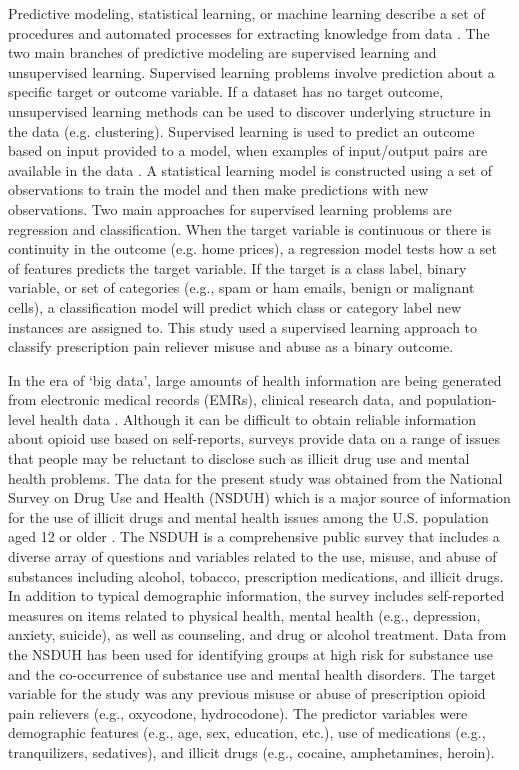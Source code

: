 \documentclass[sigconf]{acmart}
\begin{document}
Predictive modeling, statistical learning, or machine learning describe a 
set of procedures and automated processes for extracting knowledge from 
data \cite{james13, kuhn13, muller17, raschka17}. The two main branches 
of predictive modeling are supervised learning and unsupervised learning. 
Supervised learning problems involve prediction about a specific target 
or outcome variable. If a dataset has no target outcome, unsupervised 
learning methods can be used to discover underlying structure in the data 
(e.g. clustering). Supervised learning is used to predict an outcome based 
on input provided to a model, when examples of input/output pairs are 
available in the data \cite{muller17}. A statistical learning model is 
constructed using a set of observations to train the model and then make
predictions with new observations. Two main approaches for supervised learning 
problems are regression and classification. When the target variable
is continuous or there is continuity in the outcome (e.g. home prices), a 
regression model tests how a set of features predicts the target variable. 
If the target is a class label, binary variable, or set of categories 
(e.g., spam or ham emails, benign or malignant cells), a classification model 
will predict which class or category label new instances are assigned to. 
This study used a supervised learning approach to classify prescription pain
reliever misuse and abuse as a binary outcome. 


In the era of `big data', large amounts of health information are being 
generated from electronic medical records (EMRs), clinical research data, and 
population-level health data \cite{herland14}. Although it can be difficult 
to obtain reliable information about opioid use based on self-reports, surveys 
provide data on a range of issues that people may be reluctant to disclose 
such as illicit drug use and mental health problems. The data for the present 
study was obtained from the National Survey on Drug Use and Health (NSDUH) 
which is a major source of information for the use of illicit drugs and mental 
health issues among the U.S. population aged 12 or older \cite{samhsa18}. 
The NSDUH is a comprehensive public survey that includes a diverse array 
of questions and variables related to the use, misuse, and abuse of substances 
including alcohol, tobacco, prescription medications, and illicit drugs. In 
addition to typical demographic information, the survey includes self-reported
measures on items related to physical health, mental health (e.g., depression, 
anxiety, suicide), as well as counseling, and drug or alcohol treatment. Data 
from the NSDUH has been used for identifying groups at high risk for substance 
use and the co-occurrence of substance use and mental health disorders. The 
target variable for the study was any previous misuse or abuse of prescription 
opioid pain relievers (e.g., oxycodone, hydrocodone). The predictor variables 
were demographic features (e.g., age, sex, education, etc.), use of medications 
(e.g., tranquilizers, sedatives), and illicit drugs (e.g., cocaine, 
amphetamines, heroin). 
\end{document}
